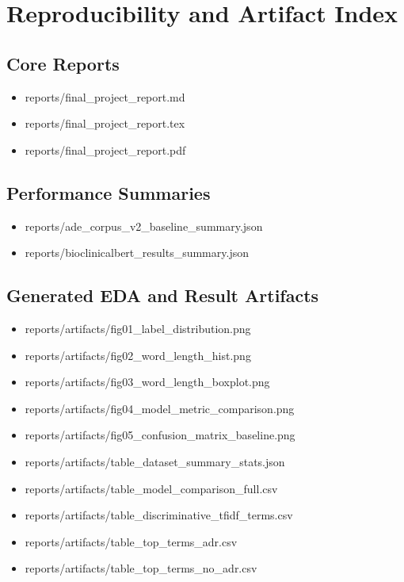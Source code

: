 \documentclass[11pt]{article}
\begin{document}
\section{Reproducibility and Artifact Index}

\subsection{Core Reports}

\begin{itemize}
  \item reports/final\_project\_report.md
  \item reports/final\_project\_report.tex
  \item reports/final\_project\_report.pdf
\end{itemize}

\subsection{Performance Summaries}

\begin{itemize}
  \item reports/ade\_corpus\_v2\_baseline\_summary.json
  \item reports/bioclinicalbert\_results\_summary.json
\end{itemize}

\subsection{Generated EDA and Result Artifacts}

\begin{itemize}
  \item reports/artifacts/fig01\_label\_distribution.png
  \item reports/artifacts/fig02\_word\_length\_hist.png
  \item reports/artifacts/fig03\_word\_length\_boxplot.png
  \item reports/artifacts/fig04\_model\_metric\_comparison.png
  \item reports/artifacts/fig05\_confusion\_matrix\_baseline.png
  \item reports/artifacts/table\_dataset\_summary\_stats.json
  \item reports/artifacts/table\_model\_comparison\_full.csv
  \item reports/artifacts/table\_discriminative\_tfidf\_terms.csv
  \item reports/artifacts/table\_top\_terms\_adr.csv
  \item reports/artifacts/table\_top\_terms\_no\_adr.csv
\end{itemize}
\end{document}
